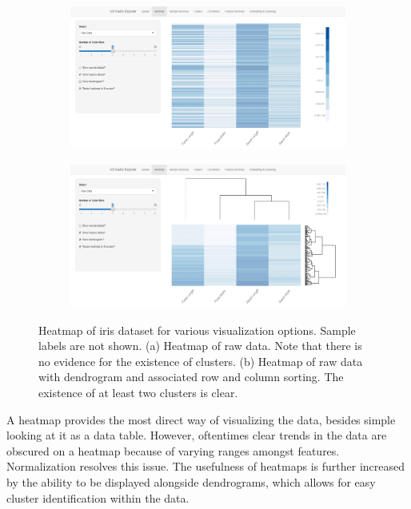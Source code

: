 \documentclass[12pt]{article}
\begin{document}
\begin{figure}[t!]
	\centering
	\begin{subfigure}[b]{0.8\textwidth}
		\includegraphics[width=\textwidth]{Figures/Iris/HeatmapRawnodendro.png}
		\subcaption{}
		\label{fig:FigHeatmapRawnodendro}
	\end{subfigure}
	\begin{subfigure}[b]{0.8\textwidth}
		\includegraphics[width=\textwidth]{Figures/Iris/HeatmapRaw.png}
		\subcaption{}
		\label{fig:FigHeatmapRaw}
	\end{subfigure}
	\caption{Heatmap of iris dataset for various visualization options. Sample labels are not shown. (a) Heatmap of raw data. Note that there is no evidence for the existence of clusters. (b) Heatmap of raw data with dendrogram and associated row and column sorting. The existence of at least two clusters is clear.}
	\label{fig:FigHeatmap}
\end{figure}

A heatmap provides the most direct way of visualizing the data, besides simple looking at it as a data table. However, oftentimes clear trends in the data are obscured on a heatmap because of varying ranges amongst features. Normalization resolves this issue. The usefulness of heatmaps is further increased by the ability to be displayed alongside dendrograms, which allows for easy cluster identification within the data.
\end{document}
